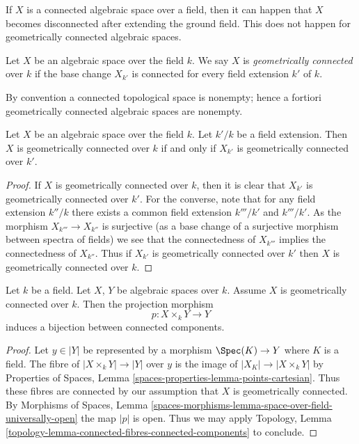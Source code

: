 \noindent
If $X$ is a connected algebraic space over a field, then it can happen that
$X$ becomes disconnected after extending the ground field. This does not
happen for geometrically connected algebraic spaces.

\begin{definition}
\label{definition-geometrically-connected}
Let $X$ be an algebraic space over the field $k$. We say $X$ is
{\it geometrically connected} over $k$ if the base change $X_{k'}$
is connected for every field extension $k'$ of $k$.
\end{definition}

\noindent
By convention a connected topological space is nonempty; hence a fortiori
geometrically connected algebraic spaces are nonempty.

\begin{lemma}
\label{lemma-geometrically-connected-check-after-extension}
Let $X$ be an algebraic space over the field $k$.
Let $k'/k$ be a field extension.
Then $X$ is geometrically connected over $k$ if and only if
$X_{k'}$ is geometrically connected over $k'$.
\end{lemma}

\begin{proof}
If $X$ is geometrically connected over $k$, then it is clear that
$X_{k'}$ is geometrically connected over $k'$. For the converse, note
that for any field extension $k''/k$ there exists a common
field extension $k'''/k'$ and $k'''/k'$. As the
morphism $X_{k'''} \to X_{k''}$ is surjective (as a base change of
a surjective morphism between spectra of fields) we see that the
connectedness of $X_{k'''}$ implies the connectedness of $X_{k''}$.
Thus if $X_{k'}$ is geometrically connected over $k'$ then
$X$ is geometrically connected over $k$.
\end{proof}

\begin{lemma}
\label{lemma-bijection-connected-components}
Let $k$ be a field. Let $X$, $Y$ be algebraic spaces over $k$.
Assume $X$ is geometrically connected over $k$.
Then the projection morphism
$$
p : X \times_k Y \longrightarrow Y
$$
induces a bijection between connected components.
\end{lemma}

\begin{proof}
Let $y \in |Y|$ be represented by a morphism $\Spec(K) \to Y$
where $K$ is a field. The fibre of $|X \times_k Y| \to |Y|$ over $y$
is the image of $|X_K| \to |X \times_k Y|$ by
Properties of Spaces, Lemma \ref{spaces-properties-lemma-points-cartesian}.
Thus these fibres are connected by our assumption that $X$ is
geometrically connected. By
Morphisms of Spaces, Lemma
\ref{spaces-morphisms-lemma-space-over-field-universally-open}
the map $|p|$ is open.
Thus we may apply Topology,
Lemma \ref{topology-lemma-connected-fibres-connected-components}
to conclude.
\end{proof}


